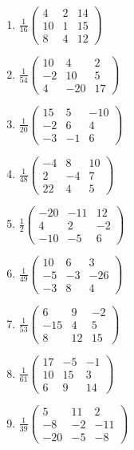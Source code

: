\begin{enumerate}[label=\arabic*., leftmargin=*, itemsep=1pt]
\item $\frac{1}{16}\left(\begin{smallmatrix}4 & 2 & 14\\ 10 & 1 & 15\\ 8 & 4 & 12\end{smallmatrix}\right)$
\item $\frac{1}{54}\left(\begin{smallmatrix}10 & 4 & 2\\ -2 & 10 & 5\\ 4 & -20 & 17\end{smallmatrix}\right)$
\item $\frac{1}{20}\left(\begin{smallmatrix}15 & 5 & -10\\ -2 & 6 & 4\\ -3 & -1 & 6\end{smallmatrix}\right)$
\item $\frac{1}{48}\left(\begin{smallmatrix}-4 & 8 & 10\\ 2 & -4 & 7\\ 22 & 4 & 5\end{smallmatrix}\right)$
\item $\frac{1}{2}\left(\begin{smallmatrix}-20 & -11 & 12\\ 4 & 2 & -2\\ -10 & -5 & 6\end{smallmatrix}\right)$
\item $\frac{1}{49}\left(\begin{smallmatrix}10 & 6 & 3\\ -5 & -3 & -26\\ -3 & 8 & 4\end{smallmatrix}\right)$
\item $\frac{1}{53}\left(\begin{smallmatrix}6 & 9 & -2\\ -15 & 4 & 5\\ 8 & 12 & 15\end{smallmatrix}\right)$
\item $\frac{1}{61}\left(\begin{smallmatrix}17 & -5 & -1\\ 10 & 15 & 3\\ 6 & 9 & 14\end{smallmatrix}\right)$
\item $\frac{1}{39}\left(\begin{smallmatrix}5 & 11 & 2\\ -8 & -2 & -11\\ -20 & -5 & -8\end{smallmatrix}\right)$

\end{enumerate}
